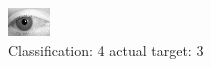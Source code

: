 \begin{figure}[h!]
\begin{center}
\includegraphics[width=0.60\columnwidth]{figures/ID2817_class_4_target_3.png}
\end{center}
\caption{ Classification: 4 actual target: 3}
\label{fig:ID2817_class_4_target_3}
\end{figure}
